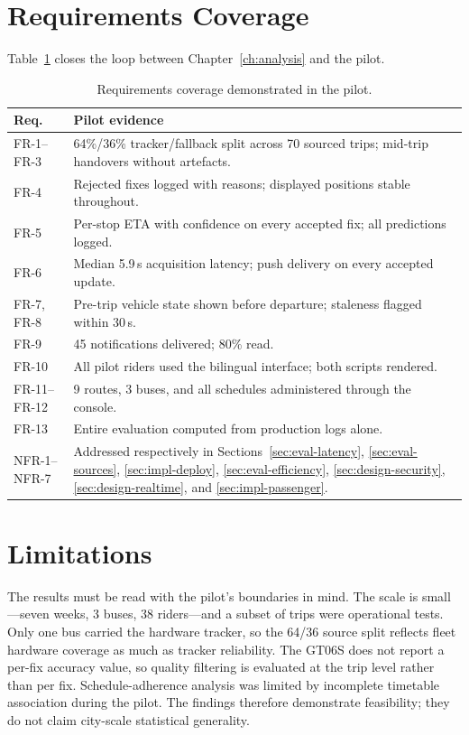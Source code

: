 \section{Requirements Coverage}
Table~\ref{tab:coverage} closes the loop between
Chapter~\ref{ch:analysis} and the pilot.

\begin{table}[H]
\caption{Requirements coverage demonstrated in the pilot.}
\label{tab:coverage}
\centering
\small
\begin{tabular}{@{}lp{10.6cm}@{}}
\toprule
\textbf{Req.} & \textbf{Pilot evidence} \\
\midrule
FR-1--FR-3 & 64\%/36\% tracker/fallback split across 70 sourced trips;
mid-trip handovers without artefacts. \\
FR-4 & Rejected fixes logged with reasons; displayed positions stable
throughout. \\
FR-5 & Per-stop ETA with confidence on every accepted fix; all
predictions logged. \\
FR-6 & Median 5.9\,s acquisition latency; push delivery on every
accepted update. \\
FR-7, FR-8 & Pre-trip vehicle state shown before departure; staleness
flagged within 30\,s. \\
FR-9 & 45 notifications delivered; 80\% read. \\
FR-10 & All pilot riders used the bilingual interface; both scripts
rendered. \\
FR-11--FR-12 & 9 routes, 3 buses, and all schedules administered through
the console. \\
FR-13 & Entire evaluation computed from production logs alone. \\
NFR-1--NFR-7 & Addressed respectively in
Sections~\ref{sec:eval-latency}, \ref{sec:eval-sources},
\ref{sec:impl-deploy}, \ref{sec:eval-efficiency},
\ref{sec:design-security}, \ref{sec:design-realtime},
and \ref{sec:impl-passenger}. \\
\bottomrule
\end{tabular}
\end{table}

\section{Limitations}
\label{sec:eval-limitations}
The results must be read with the pilot's boundaries in mind. The scale
is small---seven weeks, 3 buses, 38 riders---and a subset of trips were
operational tests. Only one bus carried the hardware tracker, so the
64/36 source split reflects fleet hardware coverage as much as tracker
reliability. The GT06S does not report a per-fix accuracy value, so
quality filtering is evaluated at the trip level rather than per fix.
Schedule-adherence analysis was limited by incomplete timetable
association during the pilot. The findings therefore demonstrate
feasibility; they do not claim city-scale statistical generality.
